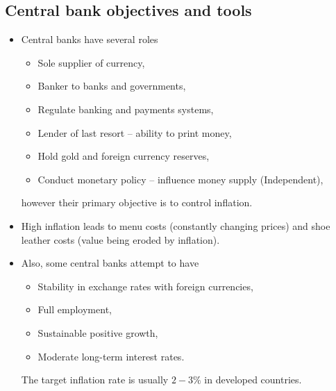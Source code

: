 \documentclass[../notes_compiled.tex]{subfiles}
\begin{document}
\subsection{Central bank objectives and tools}
\begin{itemize}
\item Central banks have several roles
\begin{itemize}
\item Sole supplier of currency,
\item Banker to banks and governments,
\item Regulate banking and payments systems,
\item Lender of last resort -- ability to print money,
\item Hold gold and foreign currency reserves,
\item Conduct monetary policy -- influence money supply (Independent),
\end{itemize}
however their primary objective is to control inflation.
\item High inflation leads to menu costs (constantly changing prices) and shoe leather costs (value being eroded by inflation).
\item Also, some central banks attempt to have
\begin{itemize}
\item Stability in exchange rates with foreign currencies,
\item Full employment,
\item Sustainable positive growth,
\item Moderate long-term interest rates.
\end{itemize}
The target inflation rate is usually $2-3\%$ in developed countries.
\end{itemize}
\end{document}
